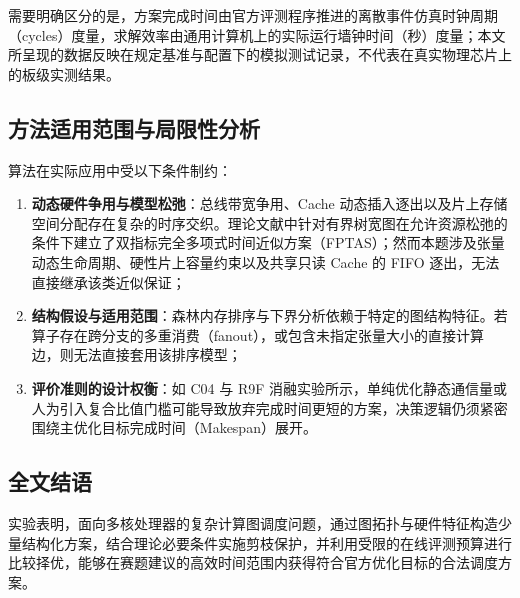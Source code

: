 \documentclass[anonymous,withtoc]{gmcm2026}
\providecommand{\tightlist}{\setlength{\itemsep}{0pt}\setlength{\parskip}{0pt}}
\begin{document}
需要明确区分的是，方案完成时间由官方评测程序推进的离散事件仿真时钟周期（cycles）度量，求解效率由通用计算机上的实际运行墙钟时间（秒）度量；本文所呈现的数据反映在规定基准与配置下的模拟测试记录，不代表在真实物理芯片上的板级实测结果。

\subsection{方法适用范围与局限性分析}

算法在实际应用中受以下条件制约：

\begin{enumerate}
\def\labelenumi{\arabic{enumi}.}
\tightlist
\item
  \textbf{动态硬件争用与模型松弛}：总线带宽争用、Cache 动态插入逐出以及片上存储空间分配存在复杂的时序交织。理论文献中针对有界树宽图在允许资源松弛的条件下建立了双指标完全多项式时间近似方案（FPTAS）\cite{ref11}；然而本题涉及张量动态生命周期、硬性片上容量约束以及共享只读 Cache 的 FIFO 逐出，无法直接继承该类近似保证；
\item
  \textbf{结构假设与适用范围}：森林内存排序与下界分析依赖于特定的图结构特征。若算子存在跨分支的多重消费（fanout），或包含未指定张量大小的直接计算边，则无法直接套用该排序模型；
\item
  \textbf{评价准则的设计权衡}：如 C04 与 R9F 消融实验所示，单纯优化静态通信量或人为引入复合比值门槛可能导致放弃完成时间更短的方案，决策逻辑仍须紧密围绕主优化目标完成时间（Makespan）展开。
\end{enumerate}

\subsection{全文结语}

实验表明，面向多核处理器的复杂计算图调度问题，通过图拓扑与硬件特征构造少量结构化方案，结合理论必要条件实施剪枝保护，并利用受限的在线评测预算进行比较择优，能够在赛题建议的高效时间范围内获得符合官方优化目标的合法调度方案。
\end{document}
